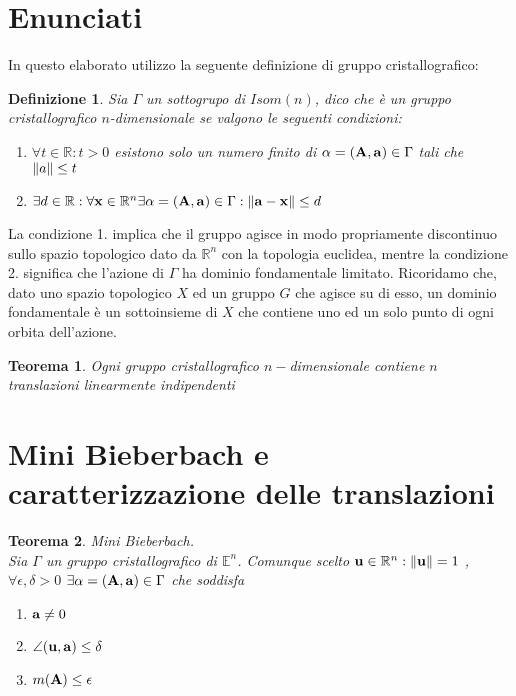 \documentclass[12pt,a4paper]{book}
\newtheorem{definition}{Definizione}[section]
\newtheorem{theorem}{Teorema}[section]
\begin{document}
\section{Enunciati}
In questo elaborato utilizzo la seguente definizione di gruppo cristallografico:
\begin{definition}
Sia $\Gamma$ un sottogrupo di $Isom(n)$, dico che è un gruppo cristallografico $n$-dimensionale se valgono le seguenti condizioni:
\begin{enumerate}
	\item $ \forall t \in \mathbb{R} : t > 0 $  esistono solo un numero finito di $\alpha = \vb{(A, a)} \in \Gamma $  tali che  $\norm{a} \leq t$
	\item $ \exists d \in \mathbb{R}: \forall \vb{x} \in \mathbb{R}^n   \exists \alpha = \vb{(A,a)} \in \Gamma : \norm{\vb{a-x}}\leq d $
\end{enumerate}
\end{definition}
La condizione 1. implica che il gruppo agisce in modo propriamente discontinuo sullo spazio topologico dato da $\mathbb{R}^n$ con la topologia euclidea, mentre la condizione 2. significa che l'azione di $\Gamma$ ha dominio fondamentale limitato. Ricoridamo che, dato uno spazio topologico $X$ ed un gruppo $G$ che agisce su di esso, un dominio fondamentale è un sottoinsieme di $X$ che contiene uno ed un solo punto di ogni orbita dell'azione.\\
\begin{theorem}
Ogni gruppo cristallografico $n-$dimensionale contiene $n$ translazioni linearmente indipendenti
\end{theorem}
\newpage 
\section{Mini Bieberbach e caratterizzazione delle translazioni} 
\begin{theorem}{Mini Bieberbach.} \\
Sia $\Gamma$ un gruppo cristallografico di $\mathbb{E}^n$. Comunque scelto $ \vb{u} \in \mathbb{R}^n : \norm{\vb{u}} = 1$ ,\\
$  \forall \epsilon ,\delta >0 $ $   \exists \alpha = \vb{(A,a)} \in \Gamma $ che soddisfa 
\begin{enumerate}
\item $\vb{a} \neq 0$ 
\item $ \angle (\vb{u, a}) \leq \delta $
\item $ m(\vb{A}) \leq \epsilon$ 
\end{enumerate}
\end{theorem}
\end{document}
